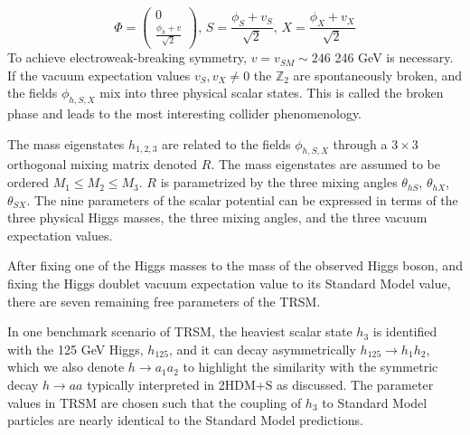 \documentclass{article}
\begin{document}
\begin{equation}
    \Phi = \begin{pmatrix} 0 \\ \frac{\phi_h + v}{\sqrt{2}} \end{pmatrix}, 
    \,
    S = \frac{\phi_S + v_S}{\sqrt{2}} ,
    \,
    X = \frac{\phi_X + v_X}{\sqrt{2}}
\end{equation}
To achieve electroweak-breaking symmetry, $v  = v_{SM} \sim 246$ 246 GeV is necessary. If the vacuum expectation values $v_S, v_X \neq 0$ the $\mathbb{Z}_2$ are spontaneously broken, and the fields $\phi_{h,S,X}$ mix into three physical scalar states. This is called the broken phase and leads to the most interesting collider phenomenology.

The mass eigenstates $h_{1,2,3}$ are related to the fields $\phi_{h,S,X}$ through a $3\times 3$ orthogonal mixing matrix denoted $R$. The mass eigenstates are assumed to be ordered $M_1 \leq M_2 \leq M_3$. $R$ is parametrized by the three mixing angles $\theta_{hS}$, $\theta_{hX}$, $\theta_{SX}$. The nine parameters of the scalar potential can be expressed in terms of the three physical Higgs masses, the three mixing angles, and the three vacuum expectation values. 

After fixing one of the Higgs masses to the mass of the observed Higgs boson, and fixing the Higgs doublet vacuum expectation value to its Standard Model value, there are seven remaining free parameters of the TRSM.

In one benchmark scenario of TRSM, the heaviest scalar state $h_3$ is identified with the 125 GeV Higgs, $h_{125}$, and it can decay asymmetrically $h_{125} \rightarrow h_1 h_2$, which we also denote $h \rightarrow a_1 a_2$ to highlight the similarity with the symmetric decay $h \rightarrow aa$ typically interpreted in 2HDM+S as discussed. The parameter values in TRSM are chosen such that the coupling of $h_3$ to Standard Model particles are nearly identical to the Standard Model predictions. 
\end{document}

